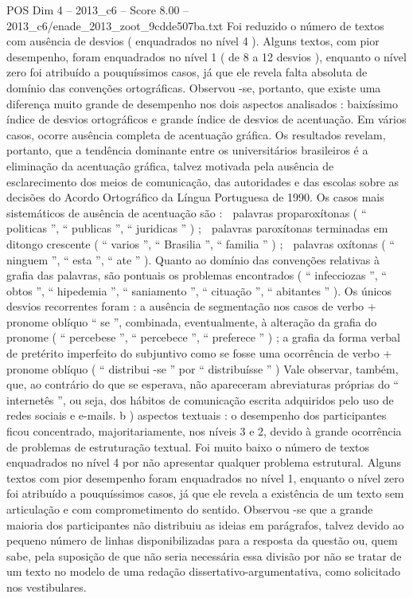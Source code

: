 \begin{textsample}{POS Dim 4 – 2013\_c6 – Score 8.00 – 2013\_c6/enade\_2013\_zoot\_9cdde507ba.txt}
Foi reduzido o número de textos com ausência de desvios ( enquadrados no nível 4 ).
Alguns textos, com pior desempenho, foram enquadrados no nível 1 ( de 8 a 12 desvios ), enquanto o nível zero foi atribuído a pouquíssimos casos, já que ele revela falta absoluta de domínio das convenções ortográficas.
Observou -se, portanto, que existe uma diferença muito grande de desempenho nos dois aspectos analisados : baixíssimo índice de desvios ortográficos e grande índice de desvios de acentuação.
Em vários casos, ocorre ausência completa de acentuação gráfica.
Os resultados revelam, portanto, que a tendência dominante entre os universitários brasileiros é a eliminação da acentuação gráfica, talvez motivada pela ausência de esclarecimento dos meios de comunicação, das autoridades e das escolas sobre as decisões do Acordo Ortográfico da Língua Portuguesa de 1990.
Os casos mais sistemáticos de ausência de acentuação são :  palavras proparoxítonas ( “ politicas ”, “ publicas ”, “ juridicas ” ) ;  palavras paroxítonas terminadas em ditongo crescente ( “ varios ”, “ Brasilia ”, “ familia ” ) ;  palavras oxítonas ( “ ninguem ”, “ esta ”, “ ate ” ).
Quanto ao domínio das convenções relativas à grafia das palavras, são pontuais os problemas encontrados ( “ infecciozas ”, “ obtos ”, “ hipedemia ”, “ saniamento ”, “ cituação ”, “ abitantes ” ).
Os únicos desvios recorrentes foram : a ausência de segmentação nos casos de verbo + pronome oblíquo “ se ”, combinada, eventualmente, à alteração da grafia do pronome ( “ percebese ”, “ percebece ”, “ preferece ” ) ; a grafia da forma verbal de pretérito imperfeito do subjuntivo como se fosse uma ocorrência de verbo + pronome oblíquo ( “ distribui -se ” por “ distribuísse ” ) Vale observar, também, que, ao contrário do que se esperava, não apareceram abreviaturas próprias do “ internetês ”, ou seja, dos hábitos de comunicação escrita adquiridos pelo uso de redes sociais e e-mails. b ) aspectos textuais : o desempenho dos participantes ficou concentrado, majoritariamente, nos níveis 3 e 2, devido à grande ocorrência de problemas de estruturação textual.
Foi muito baixo o número de textos enquadrados no nível 4 por não apresentar qualquer problema estrutural.
Alguns textos com pior desempenho foram enquadrados no nível 1, enquanto o nível zero foi atribuído a pouquíssimos casos, já que ele revela a existência de um texto sem articulação e com comprometimento do sentido.
Observou -se que a grande maioria dos participantes não distribuiu as ideias em parágrafos, talvez devido ao pequeno número de linhas disponibilizadas para a resposta da questão ou, quem sabe, pela suposição de que não seria necessária essa divisão por não se tratar de um texto no modelo de uma redação dissertativo-argumentativa, como solicitado nos vestibulares.

\end{textsample}

